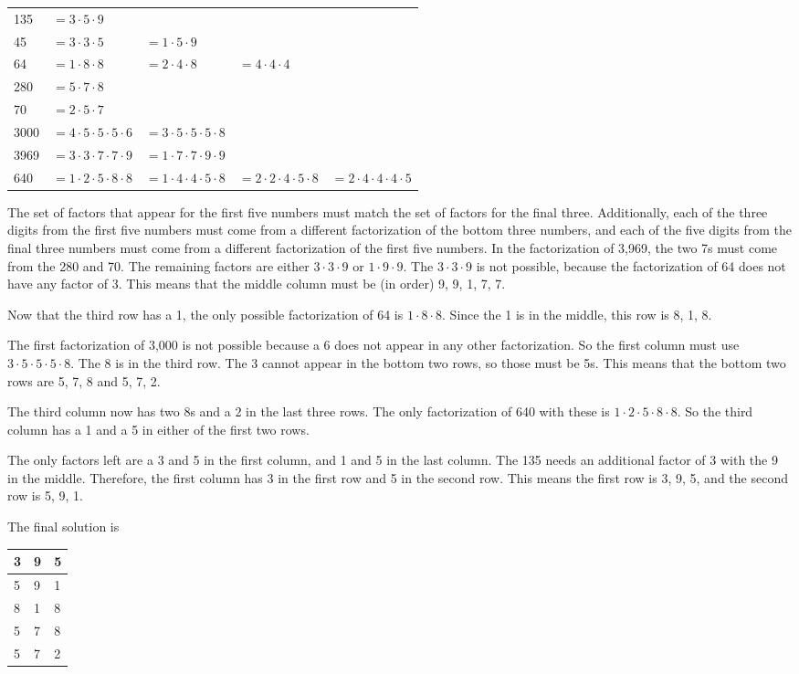 \documentclass{article}
\begin{document}
\begin{center}
\setlength{\tabcolsep}{3pt}
\begin{tabular}{lllll}
135  & $=3\cdot5\cdot9$ \\
45   & $=3\cdot3\cdot5$ & $=1\cdot5\cdot9$  \\
64   & $=1\cdot8\cdot8$ & $=2\cdot4\cdot8$ & $=4\cdot4\cdot4$ \\
280  & $=5\cdot7\cdot8$ \\
70   & $=2\cdot5\cdot7$ \\
3000 & $=4\cdot5\cdot5\cdot5\cdot6$ & $=3\cdot5\cdot5\cdot5\cdot8$ \\
3969 & $=3\cdot3\cdot7\cdot7\cdot9$ & $=1\cdot7\cdot7\cdot9\cdot9$ \\
640  & $=1\cdot2\cdot5\cdot8\cdot8$ & $=1\cdot4\cdot4\cdot5\cdot8$ & $=2\cdot2\cdot4\cdot5\cdot8$ & $=2\cdot4\cdot4\cdot4\cdot5$ \\
\end{tabular}
\end{center}

The set of factors that appear for the first five numbers must match the set of factors for the final three.
Additionally, each of the three digits from the first five numbers must come from a different factorization of the bottom three numbers, and each of the five digits from the final three numbers must come from a different factorization of the first five numbers.
In the factorization of 3,969, the two 7s must come from the 280 and 70.
The remaining factors are either $3\cdot3\cdot9$ or $1\cdot9\cdot9$.
The $3\cdot3\cdot9$ is not possible, because the factorization of 64 does not have any factor of 3.
This means that the middle column must be (in order) 9, 9, 1, 7, 7.

Now that the third row has a 1, the only possible factorization of 64 is $1\cdot8\cdot8$.
Since the 1 is in the middle, this row is 8, 1, 8.

The first factorization of 3,000 is not possible because a 6 does not appear in any other factorization.
So the first column must use $3\cdot5\cdot5\cdot5\cdot8$.
The 8 is in the third row.
The 3 cannot appear in the bottom two rows, so those must be 5s.
This means that the bottom two rows are 5, 7, 8 and 5, 7, 2.

The third column now has two 8s and a 2 in the last three rows.
The only factorization of 640 with these is $1\cdot2\cdot5\cdot8\cdot8$.
So the third column has a 1 and a 5 in either of the first two rows.

The only factors left are a 3 and 5 in the first column, and 1 and 5 in the last column.
The 135 needs an additional factor of 3 with the 9 in the middle.
Therefore, the first column has 3 in the first row and 5 in the second row.
This means the first row is 3, 9, 5, and the second row is 5, 9, 1.

The final solution is

\begin{center}
\begin{tabular}{|C{0.75in}|C{0.75in}|C{0.75in}|}
 & 9 & 5 \\
 & 9 & 1 \\
 & 1 & 8 \\
 & 7 & 8 \\
 & 7 & 2 \\
\hline
\end{tabular}
\end{center}
\end{document}
